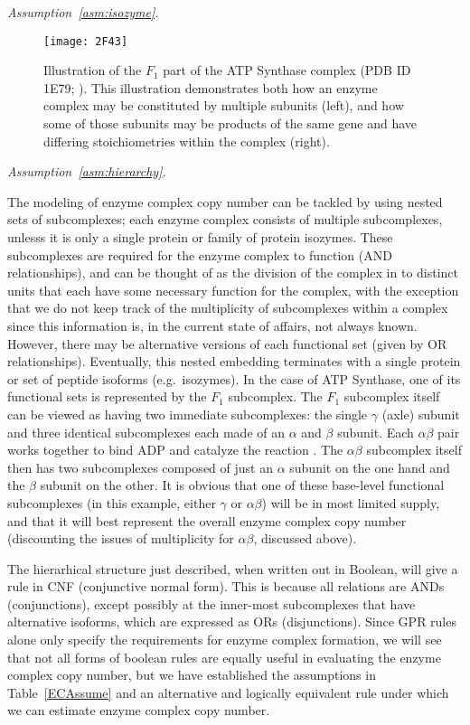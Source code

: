 \emph{Assumption~\ref{asm:isozyme}.}  

\begin{figure*}%
\label{fig:2F43}
\centering
\texttt{[image: 2F43]}
\caption{Illustration of the $F_1$ part of the ATP Synthase complex
  (PDB ID 1E79; \citealt{Gibbons2000,Bernstein1978,Gezelter}).
  This illustration demonstrates both how an enzyme complex may be
  constituted by multiple subunits (left), and how some of those
  subunits may be products of the same gene and have differing
  stoichiometries within the complex (right).}
\end{figure*}

\emph{Assumption~\ref{asm:hierarchy}.}

The modeling of enzyme complex copy number can be tackled by using
nested sets of subcomplexes; each enzyme complex consists of multiple
subcomplexes, unlesss it is only a single protein or family of protein
isozymes.  These subcomplexes are required for the enzyme complex to
function (AND relationships), and can be thought of as the division of
the complex in to distinct units that each have some necessary
function for the complex, with the exception that we do not keep track
of the multiplicity of subcomplexes within a complex since this
information is, in the current state of affairs, not always known.
However, there may be alternative versions of each functional set
(given by OR relationships). Eventually, this nested embedding
terminates with a single protein or set of peptide isoforms
(e.g.\ isozymes).  In the case of ATP Synthase, one of its functional
sets is represented by the $F_1$ subcomplex. The $F_1$ subcomplex
itself can be viewed as having two immediate subcomplexes: the single
$\gamma$ (axle) subunit and three identical subcomplexes each made of
an $\alpha$ and $\beta$ subunit. Each $\alpha\beta$ pair works
together to bind ADP and catalyze the reaction \citep{Oster2003}. The
$\alpha\beta$ subcomplex itself then has two subcomplexes composed of
just an $\alpha$ subunit on the one hand and the $\beta$ subunit on
the other.  It is obvious that one of these base-level functional
subcomplexes (in this example, either $\gamma$ or $\alpha\beta$) will
be in most limited supply, and that it will best represent the overall
enzyme complex copy number (discounting the issues of multiplicity for
$\alpha\beta$, discussed above).

%
%

The hierarhical structure just described, when written out in Boolean,
will give a rule in CNF (conjunctive normal form). This is because all
relations are ANDs (conjunctions), except possibly at the inner-most
subcomplexes that have alternative isoforms, which are expressed as
ORs (disjunctions). Since GPR rules alone only specify the
requirements for enzyme complex formation, we will see that not all
forms of boolean rules are equally useful in evaluating the enzyme
complex copy number, but we have established the assumptions in
Table~\ref{ECAssume} and an alternative and logically equivalent rule
\citep{Russell2009} under which we can estimate enzyme complex copy
number.


